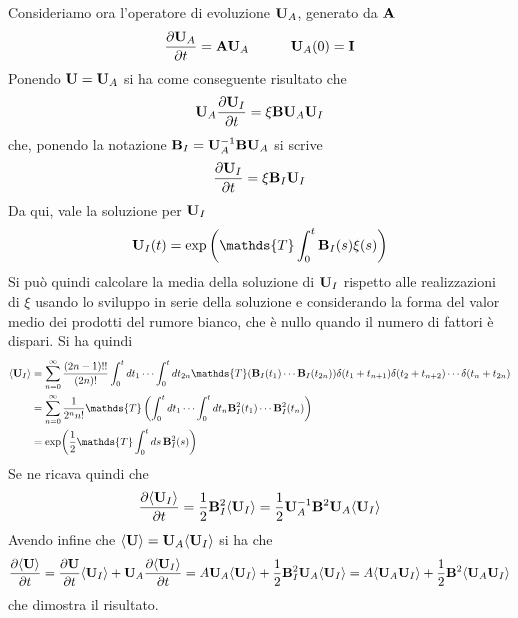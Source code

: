 \documentclass[10pt,a4paper]{article}
\begin{document}
Consideriamo ora l'operatore di evoluzione \(\vb{U}_{A}\), generato da \(\vb{A}\)
\begin{equation}
	\pdv{\vb{U}_A}{t} = \vb{A}\vb{U}_A \quad\quad\quad \vb{U}_A(0) = \vb{I}
\end{equation}
Ponendo \(\vb{U} = \vb{U}_A\) si ha come conseguente risultato che
\begin{equation}
	\vb{U}_{A} \pdv{\vb{U}_I}{t} = \xi \vb{B}\vb{U}_A \vb{U}_I
\end{equation}
che, ponendo la notazione \(\vb{B}_I = \vb{U}_A^{-1}\vb{B}\vb{U}_A\) si scrive
\begin{equation}
	\pdv{\vb{U}_I}{t} = \xi \vb{B}_I \vb{U}_I
\end{equation}
Da qui, vale la soluzione per \(\vb{U}_I\)
\begin{equation}
	\vb{U}_I(t) = \exp\left(\mathds{T}\int_0^t \vb{B}_I(s)\xi(s)\right)
\end{equation}
Si può quindi calcolare la media della soluzione di \(\vb{U}_I\) rispetto alle realizzazioni di \(\xi \) usando lo sviluppo in serie della soluzione e considerando la forma del valor medio dei prodotti del rumore bianco, che è nullo quando il numero di fattori è dispari. Si ha quindi
\begin{align}
	\langle\vb{U}_I\rangle &= \sum_{n=0}^\infty \frac{(2n-1)!!}{(2n)!}\int_0^t dt_1 \cdots \int_0^t dt_{2n} \mathds{T}(\vb{B}_I(t_1)\cdots\vb{B}_I(t_{2n})) \delta(t_1 + t_{n+1})\delta(t_2 + t_{n+2})\cdots\delta(t_n + t_{2n}) \\
	&= \sum_{n=0}^\infty \frac{1}{2^n n!} \mathds{T}\left(\int_0^t dt_1 \cdots \int_0^t dt_n \vb{B}_I^2(t_1)\cdots\vb{B}_I^2(t_n)\right) \\
	&= \exp(\frac{1}{2}\mathds{T}\int_0^t ds\, \vb{B}_I^2(s))
\end{align}
Se ne ricava quindi che
\begin{equation}
	\pdv{\langle\vb{U}_I\rangle}{t} = \frac{1}{2} \vb{B}_I^2\langle\vb{U}_I\rangle = \frac{1}{2} \vb{U}_A^{-1}\vb{B}^2\vb{U}_A\langle\vb{U}_I\rangle
\end{equation}
Avendo infine che \(\langle\vb{U}\rangle = \vb{U}_A\langle\vb{U}_I\rangle \) si ha che
\begin{equation}
	\pdv{\langle \vb{U}\rangle}{t} = \pdv{\vb{U}}{t}\langle\vb{U}_I\rangle + \vb{U}_A \pdv{\langle\vb{U}_I\rangle}{t} = A\vb{U}_A\langle\vb{U}_I\rangle + \frac{1}{2} \vb{B}^2_I\vb{U}_A\langle\vb{U}_I\rangle = A\langle\vb{U}_A\vb{U}_I\rangle + \frac{1}{2}\vb{B}^2\langle\vb{U}_A\vb{U}_I\rangle
\end{equation}
che dimostra il risultato.
\end{document}
